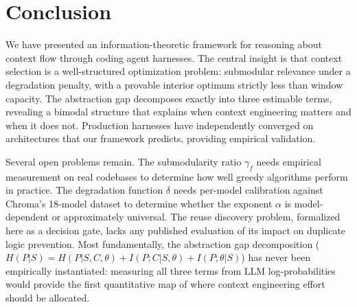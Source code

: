 \documentclass[11pt, a4paper, copyright]{googledeepmind}
\begin{document}
\section{Conclusion}
\label{sec:conclusion}

We have presented an information-theoretic framework for reasoning about context flow through coding agent harnesses. The central insight is that context selection is a well-structured optimization problem: submodular relevance under a degradation penalty, with a provable interior optimum strictly less than window capacity. The abstraction gap decomposes exactly into three estimable terms, revealing a bimodal structure that explains when context engineering matters and when it does not. Production harnesses have independently converged on architectures that our framework predicts, providing empirical validation.

Several open problems remain. The submodularity ratio $\gamma_f$ needs empirical measurement on real codebases to determine how well greedy algorithms perform in practice. The degradation function $\delta$ needs per-model calibration against Chroma's 18-model dataset to determine whether the exponent $\alpha$ is model-dependent or approximately universal. The reuse discovery problem, formalized here as a decision gate, lacks any published evaluation of its impact on duplicate logic prevention. Most fundamentally, the abstraction gap decomposition ($H(P|S) = H(P|S,C,\theta) + I(P;C|S,\theta) + I(P;\theta|S)$) has never been empirically instantiated: measuring all three terms from LLM log-probabilities would provide the first quantitative map of where context engineering effort should be allocated.



\end{document}
